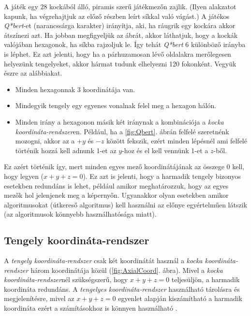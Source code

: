 A játék egy $28$ kockából álló, piramis szerű játékmezőn zajlik. (Ilyen alakzatot kapunk, ha végrehajtjuk az előző részben leírt síkkal való vágást.) A játékos \textit{Q*bert}-et (narancssárga karakter) irányítja, aki, ha ráugrik egy kockára akkor átszínezi azt. Ha jobban megfigyeljük az ábrát, akkor láthatjuk, hogy a kockák valójában hexagonok, ha síkba rajzoljuk le. Így tehát \textit{Q*bert} 6 különböző irányba is léphet. Ez azt jelenti, hogy ha a párhuzamosan lévő oldalakra merőlegesen helyezünk tengelyeket, akkor hármat tudunk elhelyezni 120 fokonként. Vegyük észre az alábbiakat.
\begin{itemize}
\item Minden hexagonnak 3 koordinátája van. 
\item Mindegyik tengely egy egyenes vonalnak felel meg a hexagon hálón.
\item Minden irány a hexagonon másik két iránynak a kombinációja a \textit{kocka koordináta-rendszer}en. Például, ha a \ref{fig:Qbert}. ábrán felfelé szeretnénk mozogni, akkor az a $+y$ és $-z$ között fekszik, ezért minden lépésnél ami felfelé történik hozzá kell adnunk 1-et az $y$-hoz és el kell vennünk 1-et a $z$-ből. 
\end{itemize}
Ez azért történik így, mert minden egyes mező koordinátájának az összege $0$ kell, hogy legyen ($x + y + z = 0$). Ez azt is jelenti, hogy a harmadik tengely bizonyos esetekben redundáns is lehet, például amikor meghatározzuk, hogy az egyes mezők hol jelenjenek meg a képernyőn. Ugyanakkor olyan esetekben amikor algoritmusokat (útkereső algoritmus) kell használni az előnye egyértelműen látszik (az algoritmusok könnyebb használhatósága miatt). 

\subsection{Tengely koordináta-rendszer}

A \textit{tengely koordináta-rendszer} csak két koordinátát használ a \textit{kocka koordináta-rendszer} három koordinátája közül (\ref{fig:AxialCoord}. ábra). Mivel a \textit{kocka koordináta-rendszer}nél szükségszerű, hogy  $x + y + z = 0$ teljesüljön, a harmadik koordináta redundáns.  A \textit{tengelyes koordináta-rendszer} használható tárolásra és megjelenítésre, mivel az $x + y + z = 0$ egyenlet alapján kiszámítható a harmadik koordináta ezért a számításokhoz is könnyen használható \cite{redblobgamesHexagonalGrids}.

